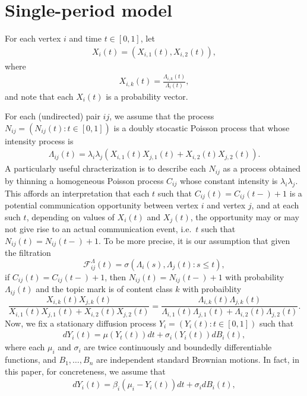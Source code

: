 \documentclass[12pt]{article}%
\begin{document}
\section{Single-period model}
For each vertex $i$ and time $t\in[0,1]$, let 
\begin{eqnarray}
X_i(t) = (X_{i,1}(t), X_{i,2}(t)),
\end{eqnarray}
where
\begin{eqnarray}
X_{i,k}(t) = \frac{\Lambda_{i,k}(t)}{\Lambda_i(t)},
\end{eqnarray}
and note that each $X_i(t)$ is a probability vector. 

For each (undirected) pair $ij$, we assume that 
the process $N_{ij} = (N_{ij}(t):t\in[0,1])$ is   
a doubly stocastic Poisson process that whose intensity process is  
\begin{eqnarray}
\Lambda_{ij}(t) = \lambda_i \lambda_j (X_{i,1}(t)X_{j,1}(t) + X_{i,2}(t)X_{j,2}(t)).
\end{eqnarray}
A particularly useful chracterization is to describe each $N_{ij}$ as a process obtained 
by thinning a homogeneous Poisson process $C_{ij}$ whose constant intensity is $\lambda_i \lambda_j$.  
This affords an interpretation that each $t$ such that $C_{ij}(t) = C_{ij}(t-) +1$ 
is a potential communication opportunity between vertex $i$ and vertex $j$, 
and at each such $t$, depending on values of $X_i(t)$ and $X_j(t)$, 
the opportunity may or may not give rise to an actual communication event, i.e.\ $t$ such that $N_{ij}(t) = N_{ij}(t-) +1$. To be more precise, it is our assumption that given the filtration 
$$
\mathcal F_{ij}^\Lambda(t) = \sigma(\Lambda_i(s), \Lambda_j(t): s \le t), 
$$
if $C_{ij}(t) = C_{ij}(t-)+1$, then
$N_{ij}(t) = N_{ij}(t-) + 1$ with probability $\Lambda_{ij}(t)$ and the topic mark is of content class $k$ with probaiblity 
$$
\frac{X_{i,k}(t)X_{j,k}(t)}{X_{i,1}(t)X_{j,1}(t) + X_{i,2}(t)X_{j,2}(t)}
=
\frac{\Lambda_{i,k}(t)\Lambda_{j,k}(t)}{\Lambda_{i,1}(t)\Lambda_{j,1}(t) + \Lambda_{i,2}(t)\Lambda_{j,2}(t)}.
$$
Now, we fix a stationary diffusion process $Y_i=(Y_i(t):t\in [0,1])$ such that  
\begin{eqnarray}
dY_i(t) = \mu(Y_t(t)) dt + \sigma_i(Y_i(t)) dB_i(t),
\end{eqnarray}
where each $\mu_i$ and $\sigma_i$ are twice continuously and boundedly differentiable functions, and $B_1,\ldots,B_n$ are independent standard Brownian motions.
In fact, in this paper, for concreteness, we assume that 
\begin{eqnarray}
dY_i(t) = \beta_i (\mu_i - Y_i(t)) dt + \sigma_i dB_i(t),
\end{eqnarray}
\end{document}
